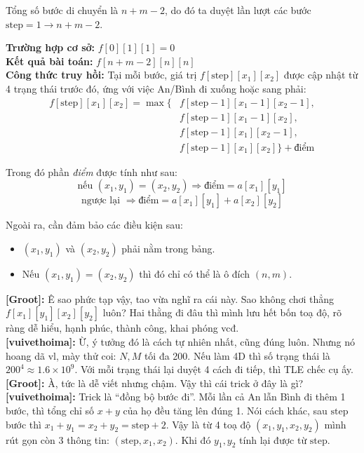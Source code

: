 Tổng số bước di chuyển là $n + m - 2$, do đó ta duyệt lần lượt các bước $\text{step} = 1 \rightarrow n + m - 2$.

\textbf{Trường hợp cơ sở:} $f[0][1][1] = 0$\\

\textbf{Kết quả bài toán:} $f[n + m - 2][n][n]$\\

\textbf{Công thức truy hồi:}  
Tại mỗi bước, giá trị $f[\text{step}][x_1][x_2]$ được cập nhật từ 4 trạng thái trước đó, ứng với việc An/Bình đi xuống hoặc sang phải:
\[
\begin{aligned}
f[\text{step}][x_1][x_2] = \max \Big\{ 
   & f[\text{step} - 1][x_1 - 1][x_2 - 1], \\
   & f[\text{step} - 1][x_1 - 1][x_2], \\
   & f[\text{step} - 1][x_1][x_2 - 1], \\
   & f[\text{step} - 1][x_1][x_2] 
\Big\} + \text{điểm}
\end{aligned}
\]

Trong đó phần \textit{điểm} được tính như sau:
\[
\text{nếu } (x_1, y_1) = (x_2, y_2) \Rightarrow \text{điểm} = a[x_1][y_1]
\]
\[
\text{ngược lại } \Rightarrow \text{điểm} = a[x_1][y_1] + a[x_2][y_2]
\]

Ngoài ra, cần đảm bảo các điều kiện sau:
\begin{itemize}
    \item $(x_1, y_1)$ và $(x_2, y_2)$ phải nằm trong bảng.
    \item Nếu $(x_1, y_1) = (x_2, y_2)$ thì đó chỉ có thể là ô đích $(n,m)$.
\end{itemize}


\textbf{[Groot]:} Ê sao phức tạp vậy, tao vừa nghĩ ra cái này. Sao không chơi thẳng $f[x_1][y_1][x_2][y_2]$ luôn?  
Hai thằng đi đâu thì mình lưu hết bốn toạ độ, rõ ràng dễ hiểu, hạnh phúc, thành công, khai phóng vcđ.\\

\textbf{[vuivethoima]:} Ừ, ý tưởng đó là cách tự nhiên nhất, cũng đúng luôn.  
Nhưng nó hoang dã vl, mày thử coi: $N, M$ tối đa 200.  
Nếu làm 4D thì số trạng thái là $200^4 \approx 1.6 \times 10^9$.  
Với mỗi trạng thái lại duyệt 4 cách đi tiếp, thì TLE chếc cụ ấy.\\

\textbf{[Groot]:} À, tức là dễ viết nhưng chậm. Vậy thì cái trick ở đây là gì?\\

\textbf{[vuivethoima]:} Trick là ``đồng bộ bước đi''.  
Mỗi lần cả An lẫn Bình đi thêm 1 bước, thì tổng chỉ số $x+y$ của họ đều tăng lên đúng 1.  
Nói cách khác, sau $\text{step}$ bước thì $x_1+y_1 = x_2+y_2 = \text{step}+2$.  
Vậy là từ 4 toạ độ $(x_1,y_1,x_2,y_2)$ mình rút gọn còn 3 thông tin: $(\text{step}, x_1, x_2)$.  
Khi đó $y_1, y_2$ tính lại được từ $\text{step}$.\\

